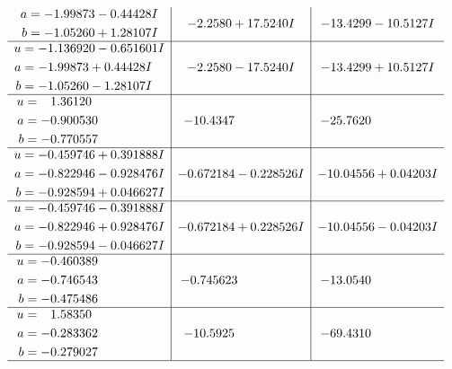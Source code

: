 \documentclass[1p]{elsarticle_modified}
\theoremstyle{definition}
\begin{document}
$$\begin{array}{c|c|c}
\begin{aligned}
a &= -1.99873 - 0.44428 I \\
b &= -1.05260 + 1.28107 I\end{aligned}
 & -2.2580 + 17.5240 I & -13.4299 - 10.5127 I \\ \hline\begin{aligned}
u &= -1.136920 - 0.651601 I \\
a &= -1.99873 + 0.44428 I \\
b &= -1.05260 - 1.28107 I\end{aligned}
 & -2.2580 - 17.5240 I & -13.4299 + 10.5127 I \\ \hline\begin{aligned}
u &= \phantom{-}1.36120\phantom{ +0.000000I} \\
a &= -0.900530\phantom{ +0.000000I} \\
b &= -0.770557\phantom{ +0.000000I}\end{aligned}
 & -10.4347\phantom{ +0.000000I} & -25.7620\phantom{ +0.000000I} \\ \hline\begin{aligned}
u &= -0.459746 + 0.391888 I \\
a &= -0.822946 - 0.928476 I \\
b &= -0.928594 + 0.046627 I\end{aligned}
 & -0.672184 - 0.228526 I & -10.04556 + 0.04203 I \\ \hline\begin{aligned}
u &= -0.459746 - 0.391888 I \\
a &= -0.822946 + 0.928476 I \\
b &= -0.928594 - 0.046627 I\end{aligned}
 & -0.672184 + 0.228526 I & -10.04556 - 0.04203 I \\ \hline\begin{aligned}
u &= -0.460389\phantom{ +0.000000I} \\
a &= -0.746543\phantom{ +0.000000I} \\
b &= -0.475486\phantom{ +0.000000I}\end{aligned}
 & -0.745623\phantom{ +0.000000I} & -13.0540\phantom{ +0.000000I} \\ \hline\begin{aligned}
u &= \phantom{-}1.58350\phantom{ +0.000000I} \\
a &= -0.283362\phantom{ +0.000000I} \\
b &= -0.279027\phantom{ +0.000000I}\end{aligned}
 & -10.5925\phantom{ +0.000000I} & -69.4310\phantom{ +0.000000I}\\
 \hline 
 \end{array}$$\newpage\newpage\renewcommand{\arraystretch}{1}
\end{document}
